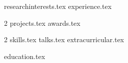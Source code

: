 \documentclass[a4paper,12pt]{article}
\begin{document}
\pagecolor{Background}


{researchinterests.tex}
{experience.tex}
\begin{multicols}{2}
{projects.tex}
\columnbreak
{awards.tex}
\end{multicols}

\begin{multicols}{2}
{skills.tex}
\columnbreak
{talks.tex}
{extracurricular.tex}
\end{multicols}
{education.tex}
\end{document}
